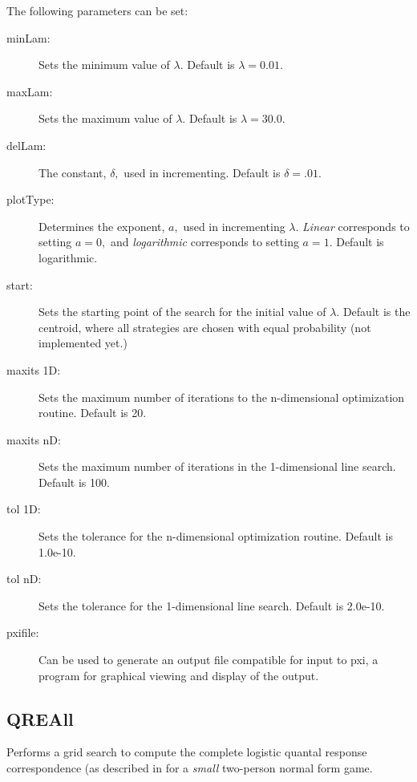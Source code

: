 {The following parameters can be set:

\begin{description}
\item[minLam:] Sets the minimum value of $\lambda.$ 
Default is $\lambda = 0.01$.
\item[maxLam:] Sets the maximum value of $\lambda.$  Default is 
$\lambda = 30.0.$
\item[delLam:]  The constant, $\delta,$ used in incrementing.   Default is 
$\delta = .01.$
\item[plotType:] Determines the exponent, $a,$ used in incrementing 
$\lambda.$  {\em Linear} corresponds to setting $a = 0,$ and {\em 
logarithmic} corresponds to setting $a = 1.$ Default is logarithmic.
\item[start:] Sets the starting point of the search for the initial value of 
$\lambda.$  Default is the centroid, where all strategies are chosen 
with equal probability (not implemented yet.)
\item[maxits 1D:] Sets the maximum number of iterations to the 
n-dimensional optimization routine.  Default is 20.
\item[maxits nD:] Sets the maximum number of iterations in the 
1-dimensional line search.  Default is 100.
\item[tol 1D:] Sets the tolerance for the n-dimensional optimization 
routine.  Default is 1.0e-10.
\item[tol nD:] Sets the tolerance for the 1-dimensional line search. 
Default is 2.0e-10.
\item[pxifile:] Can be used to generate an output file compatible for 
input to pxi, a program for graphical viewing and display of the output. 
\end{description}

\subsection{QREAll}\label{QREAll}
Performs a grid search to compute the complete logistic
quantal response correspondence (as described in \cite{McKPal:95a}
for a {\em small} two-person normal form game.

}
